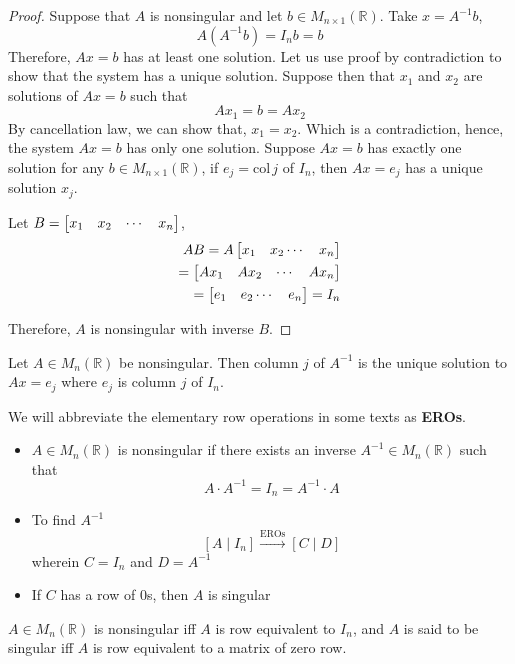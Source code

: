 \begin{proof}
Suppose that $A$ is nonsingular and let $b \in M_{n \times 1}(\mathbb{R})$. Take $x = A^{-1}b$,
$$A(A^{-1}b) = I_nb = b$$
Therefore, $Ax = b$ has at least one solution. Let us use proof by contradiction to show that the system has a unique solution. Suppose then that $x_1$ and $x_2$ are solutions of $Ax = b$ such that
$$Ax_1 = b = Ax_2$$
By cancellation law, we can show that, $x_1 = x_2$. Which is a contradiction, hence, the system $Ax = b$ has only one solution. Suppose $Ax = b$ has exactly one solution for any $b \in M_{n \times 1}(\mathbb{R})$, if $e_j = \text{col}\, j$ of $I_n$, then $Ax = e_j$ has a unique solution $x_j$.

Let $B = \begin{bmatrix} x_1 & x_2 & \cdots & x_n \end{bmatrix}$,
\begin{align*}
AB = A\begin{bmatrix} x_1 & x_2 \cdots & x_n \end{bmatrix} \\
= \begin{bmatrix} Ax_1 & Ax_2 & \cdots & Ax_n \end{bmatrix} \\
= \begin{bmatrix} e_1 & e_2 \cdots & e_n \end{bmatrix} = I_n
\end{align*}

Therefore, $A$ is nonsingular with inverse $B$.
\end{proof}

\begin{remark}
Let $A \in M_n(\mathbb{R})$ be nonsingular. Then column $j$ of $A^{-1}$ is the unique solution to $Ax = e_j$ where $e_j$ is column $j$ of $I_n$.
\end{remark}

\lline

We will abbreviate the elementary row operations in some texts as \textbf{EROs}.

\begin{itemize}
    \item $A \in M_n(\mathbb{R})$ is nonsingular if there exists an inverse $A^{-1} \in M_n(\mathbb{R})$ such that
    $$A\cdot A^{-1} = I_n = A^{-1} \cdot A$$
    \item To find $A^{-1}$
    $$[A \mid I_n] \stackrel{\text{EROs}}{\longrightarrow} [C \mid D]$$
    wherein $C = I_n$ and $D = A^{-1}$
    \item If $C$ has a row of 0s, then $A$ is singular

\end{itemize}

\begin{remark}
$A \in M_n(\mathbb{R})$ is nonsingular iff $A$ is row equivalent to $I_n$, and $A$ is said to be singular iff $A$ is row equivalent to a matrix of zero row.
\end{remark}

